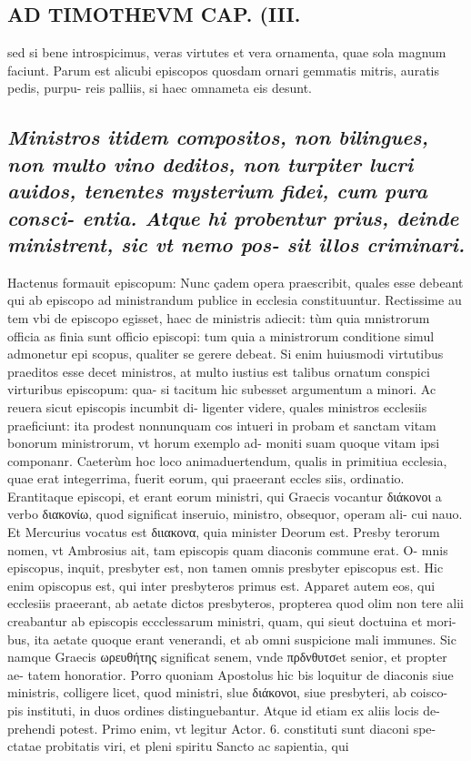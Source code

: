 \documentclass{article}
\begin{document}
\begin{pages}
\section*{AD TIMOTHEVM CAP. (III. }
\marginpar{[ p.81 ]}\pstart sed si bene introspicimus, veras virtutes et vera ornamenta, quae sola magnum faciunt. Parum est alicubi episcopos quosdam ornari gemmatis mitris, auratis pedis, purpu- reis palliis, si haec omnameta eis desunt.  \pend
{}
{}
\subsection*{\textit{Ministros itidem compositos, non bilingues, non multo vino deditos, non turpiter lucri auidos, tenentes mysterium fidei, cum pura consci- entia. Atque hi probentur prius, deinde ministrent, sic vt nemo pos- sit illos criminari. }}\pstart Hactenus formauit episcopum: Nunc çadem opera praescribit, quales esse debeant qui ab episcopo ad ministrandum publice in ecclesia constituuntur. Rectissime au tem vbi de episcopo egisset, haec de ministris adiecit: tùm quia mnistrorum officia as finia sunt officio episcopi: tum quia a ministrorum conditione simul admonetur epi scopus, qualiter se gerere debeat. Si enim huiusmodi virtutibus praeditos esse decet ministros, at multo iustius est talibus ornatum conspici virturibus episcopum: qua- si tacitum hic subesset argumentum a minori. Ac reuera sicut episcopis incumbit di- ligenter videre, quales ministros ecclesiis praeficiunt: ita prodest nonnunquam cos intueri in probam et sanctam vitam bonorum ministrorum, vt horum exemplo ad- moniti suam quoque vitam ipsi componanr. Caeterùm hoc loco animaduertendum, qualis in primitiua ecclesia, quae erat integerrima, fuerit eorum, qui praeerant eccles siis, ordinatio. Erantitaque episcopi, et erant eorum ministri, qui Graecis vocantur διάκονοι a verbo διακονίω, quod significat inseruio, ministro, obsequor, operam ali- cui nauo. Et Mercurius vocatus est διιακονα, quia minister Deorum est. Presby terorum nomen, vt Ambrosius ait, tam episcopis quam diaconis commune erat. O- mnis episcopus, inquit, presbyter est, non tamen omnis presbyter episcopus est. Hic enim opiscopus est, qui inter presbyteros primus est. Apparet autem eos, qui ecclesiis praeerant, ab aetate dictos presbyteros, propterea quod olim non tere alii creabantur ab episcopis eccclessarum ministri, quam, qui sieut doctuina et mori- bus, ita aetate quoque erant venerandi, et ab omni suspicione mali immunes. Sic namque Graecis ωρευθήτης significat senem, vnde πρδνθυτσet senior, et propter ae- tatem honoratior. Porro quoniam Apostolus hic bis loquitur de diaconis siue ministris, colligere licet, quod ministri, slue διάκονοι, siue presbyteri, ab coisco- pis instituti, in duos ordines distinguebantur. Atque id etiam ex aliis locis de- prehendi potest. Primo enim, vt legitur Actor. 6. constituti sunt diaconi spe- ctatae probitatis viri, et pleni spiritu Sancto ac sapientia, qui 
\end{pages}
\end{document}

